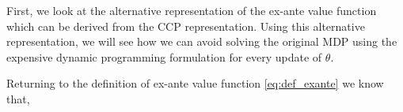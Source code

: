 \documentclass{article}
\renewcommand{\vec}[1]{\mbox{\bm{$#1$}}}
\begin{document}
First, we look at the alternative representation of the ex-ante value function which can be derived from the CCP representation.
Using this alternative representation, we will see how we can avoid solving the original MDP using the expensive dynamic programming formulation for every update of $\theta$.


Returning to the definition of ex-ante value function \eqref{eq:def_exante} we know that,
\end{document}

